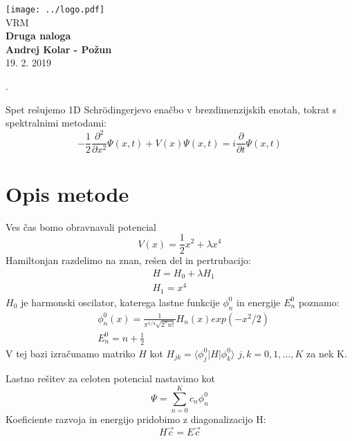 \documentclass{article}
\begin{document}
\begin{titlepage}
    \begin{center}
        \vspace*{1cm}
        \Large
\texttt{[image: ../logo.pdf]}\\
        \Large
\vspace{1cm}
        VRM\\
        \huge
        \textbf{Druga naloga\\}
\Large  
        \vspace{1cm}
        \textbf{Andrej Kolar - Po{\v z}un\\}
        \vspace{0.8cm}
 19. 2. 2019

\vfill
\normalsize
\end{center}. 
\end{titlepage}
\newpage
{}

Spet rešujemo 1D Schrödingerjevo enačbo v brezdimenzijskih enotah, tokrat s spektralnimi metodami:
\begin{equation*}
-\frac{1}{2}\frac{\partial^2}{\partial x^2} \Psi(x,t) + V(x) \Psi(x,t) = i \frac{\partial}{\partial t} \Psi(x,t)
\end{equation*}

\section*{Opis metode}

Ves čas bomo obravnavali potencial
\begin{equation*}
V(x) = \frac{1}{2} x^2 + \lambda x^4
\end{equation*}
Hamiltonjan razdelimo na znan, rešen del in pertrubacijo:
\begin{align*}
&H = H_0 + \lambda H_1 \\
&H_1 = x^4
\end{align*}
$H_0$ je harmonski oscilator, katerega lastne funkcije $\phi^0_n$ in energije $E^0_n$ poznamo:
\begin{align*}
&\phi^0_n(x) = \frac{1}{\pi^{1/4}\sqrt{2^n n!}} H_n (x) exp(-x^2/2) \\
&E^0_n = n + \frac{1}{2}
\end{align*}
V tej bazi izračunamo matriko $H$ kot $H_{jk} = \langle \phi^0_j | H | \phi^0_k \rangle$ $j,k = 0,1,...,K$ za nek K.

Lastno rešitev za celoten potencial nastavimo kot
\begin{equation*}
\Psi = \sum_{n=0}^K c_n \phi^0_n
\end{equation*}
Koeficiente razvoja in energijo pridobimo z diagonalizacijo H:
\begin{equation*}
H \vec{c} = E \vec{c}
\end{equation*}
\end{document}

